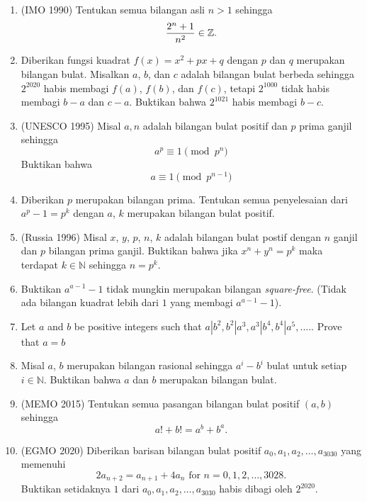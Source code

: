 \documentclass[11pt]{scrartcl}
\begin{document}
\begin{enumerate}[resume]
    \item (IMO 1990) Tentukan semua bilangan asli $n > 1$ sehingga 
    \begin{align*}
        \dfrac{2^n+1}{n^2} \in \mathbb Z.
    \end{align*}
    
    \item  Diberikan fungsi kuadrat $f(x) = x^2 + px + q$ dengan $p$ dan $q$ merupakan bilangan bulat. Misalkan $a$, $b$, dan $c$ adalah bilangan bulat berbeda sehingga $2^2020$ habis membagi $f(a)$, $f(b)$, dan $f(c)$, tetapi $2^1000$ tidak habis membagi $b-a$ dan $c-a$. Buktikan bahwa $2^1021$ habis membagi $b-c$.
    
    \item (UNESCO 1995) Misal $a,n$ adalah bilangan bulat positif dan $p$ prima ganjil sehingga $$a^p \equiv 1 \pmod{p^n}$$ Buktikan bahwa $$a \equiv 1 \pmod{p^{n-1}}$$ 
    
    \item  Diberikan $p$ merupakan bilangan prima. Tentukan semua penyelesaian dari $a^p - 1 = p^k$ dengan $a$, $k$ merupakan bilangan bulat positif.
    
    \item (Russia 1996)  Misal $x$, $y$, $p$, $n$, $k$ adalah bilangan bulat postif dengan $n$ ganjil dan $p$ bilangan prima ganjil. Buktikan bahwa jika $x^n + y^n = p^k$ maka terdapat $k\in\mathbb{N}$ sehingga $n=p^k$. 
    
    \item  Buktikan $a^{a-1} - 1$ tidak mungkin merupakan bilangan \textit{square-free}. (Tidak ada bilangan kuadrat lebih dari $1$ yang membagi $a^{a-1} - 1$).
    
    \item Let $a$ and $b$ be positive integers such that $a|b^2,b^2|a^3,a^3|b^4,b^4|a^5,....$. Prove that $a=b$
    
    \item  Misal $a$, $b$ merupakan bilangan rasional sehingga $a^i - b^i$ bulat untuk setiap $i \in \mathbb{N}$. Buktikan bahwa $a$ dan $b$ merupakan bilangan bulat.
    
    \item (MEMO 2015) Tentukan semua pasangan bilangan bulat positif $(a,b)$ sehingga
    $$a!+b!=a^b + b^a.$$ 
    
    \item (EGMO 2020) Diberikan barisan bilangan bulat positif $a_0, a_1, a_2, \ldots, a_{3030}$ yang memenuhi $$2a_{n + 2} = a_{n + 1} + 4a_n \text{ for } n = 0, 1, 2, \ldots, 3028.$$
    Buktikan setidaknya $1$ dari $a_0, a_1, a_2, \ldots, a_{3030}$ habis dibagi oleh $2^{2020}$. 
    

\end{enumerate}
\end{document}

